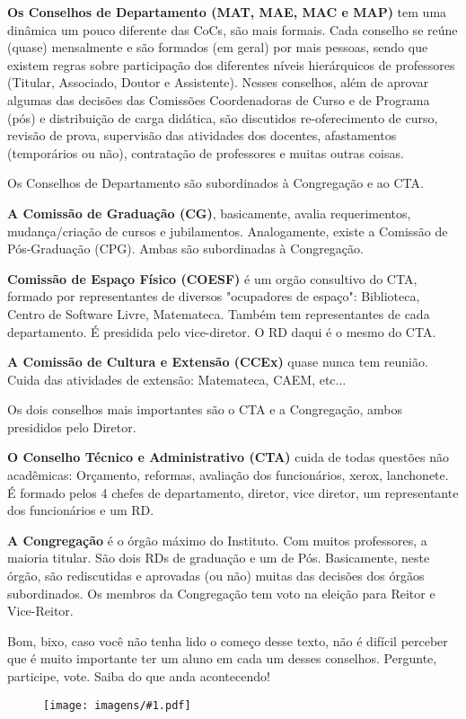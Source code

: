 \documentclass[11pt]{report}
\newenvironment{secao}[1] {
    \framebox[\textwidth] {
        \rule[-1.2ex]{5ex}{5.5ex}
        {\Large\sf #1}
        \hspace{\stretch{1}}
    } \addcontentsline{toc}{chapter}{#1}
    \nopagebreak[4]
} { 
}
\newcommand{\figura}[1] {
    \begin{figure}[!htbp]
      \begin{center}
        \texttt{[image: imagens/\#1.pdf]}
      \end{center}
    \end{figure}
}
\newcommand{\quadrinhos}[1] {
    \figura{quad#1}
}
\begin{document}
\begin{secao}{O que é RD?}
{\bf Os Conselhos de Departamento (MAT, MAE, MAC e MAP)} tem uma dinâmica
um pouco diferente das CoCs, são mais formais. Cada conselho
se reúne (quase) mensalmente e são formados (em geral) por mais pessoas,
sendo
que existem regras sobre participação dos diferentes níveis
hierárquicos de professores (Titular, Associado, Doutor e Assistente). Nesses
conselhos, além de aprovar algumas das decisões das Comissões
Coordenadoras de Curso e de Programa (pós) e distribuição de
carga didática, são discutidos re-oferecimento de curso, revisão de prova,
supervisão das atividades dos docentes, afastamentos (temporários ou não),
contratação de professores e muitas outras coisas.

Os Conselhos de Departamento são subordinados à Congregação e ao CTA.
 
{\bf A Comissão de Graduação (CG)}, basicamente, avalia requerimentos,
mudança/criação de cursos e jubilamentos.
Analogamente, existe a Comissão de Pós-Graduação (CPG). Ambas são
subordinadas à Congregação.
 
{\bf Comissão de Espaço Físico (COESF)} é um orgão consultivo do CTA, formado
por representantes de diversos "ocupadores de espaço": Biblioteca, Centro
de Software Livre, Matemateca. Também tem representantes de cada
departamento. É presidida pelo vice-diretor. O RD daqui é o mesmo do CTA.
 
{\bf A Comissão de Cultura e Extensão (CCEx)} quase nunca tem reunião. Cuida das
atividades de extensão: Matemateca, CAEM, etc...
 
Os dois conselhos mais importantes são o CTA e a Congregação, ambos
presididos pelo Diretor.
 
{\bf O Conselho Técnico e Administrativo (CTA)} cuida de todas questões não
acadêmicas: Orçamento, reformas, avaliação dos funcionários, xerox,
lanchonete. É formado pelos 4 chefes de departamento, diretor, vice diretor, um
representante dos funcionários e um RD.
 
{\bf A Congregação} é o órgão máximo do Instituto. Com muitos professores, a
maioria titular. São dois RDs de graduação e um de Pós. Basicamente, neste
órgão, são rediscutidas e aprovadas (ou não) muitas das decisões dos órgãos
subordinados. Os membros da Congregação tem voto na eleição para Reitor e
Vice-Reitor. 
 
Bom, bixo, caso você não tenha lido o começo desse texto, não é difícil perceber que é muito importante ter um aluno em cada um desses conselhos. Pergunte, participe, vote. Saiba do que anda acontecendo! 

\quadrinhos3

\pagebreak
\end{secao}
\end{document}
